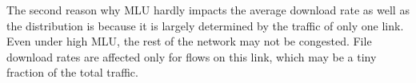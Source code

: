 

The second reason why MLU hardly impacts the average download rate as well as the distribution is because it is largely determined by the traffic of only one link. Even under high MLU, the rest of the network may not be congested. File download rates are affected only for flows on this link, which may be a tiny fraction of the total traffic.









